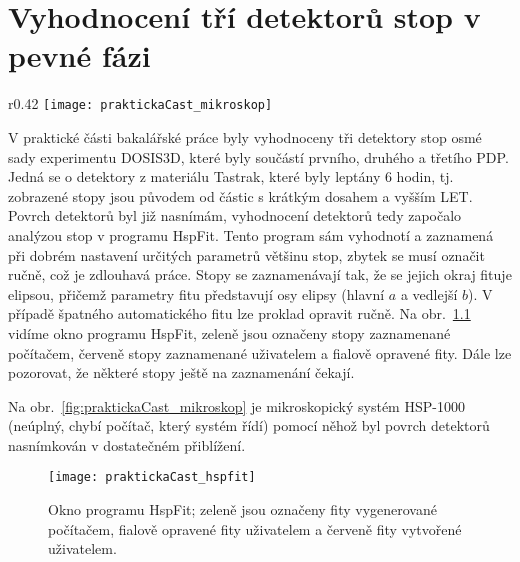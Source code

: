 \chapter{Vyhodnocení tří detektorů stop v pevné fázi}
\begin{wrapfigure}{r}{0.42\textwidth}
  \centering
  \texttt{[image: praktickaCast\_mikroskop]}
  \caption{Vysoko rychlostní optický mikroskop HSP-1000. \cite{dosis_HSP1000}}
  \label{fig:praktickaCast_mikroskop}
  \vspace{-10pt}
\end{wrapfigure}
V praktické části bakalářské práce byly vyhodnoceny tři detektory stop osmé sady experimentu DOSIS3D, které byly součástí prvního, druhého a třetího PDP. Jedná se o detektory z materiálu Tastrak, které byly leptány 6 hodin, tj. zobrazené stopy jsou původem od částic s krátkým dosahem a vyšším LET. Povrch detektorů byl již nasnímám, vyhodnocení detektorů tedy započalo analýzou stop v programu HspFit. Tento program sám vyhodnotí a zaznamená při dobrém nastavení určitých parametrů většinu stop, zbytek se musí označit ručně, což je zdlouhavá práce. Stopy se zaznamenávají tak, že se jejich okraj fituje elipsou, přičemž parametry fitu představují osy elipsy (hlavní $a$ a vedlejší $b$). V případě špatného automatického fitu lze proklad opravit ručně. Na obr.~\ref{fig:praktickaCast_hspfit} vidíme okno programu HspFit, zeleně jsou označeny stopy zaznamenané počítačem, červeně stopy zaznamenané uživatelem a fialově opravené fity. Dále lze
pozorovat, že některé stopy ještě na zaznamenání čekají. 

Na obr.~\ref{fig:praktickaCast_mikroskop} je mikroskopický systém HSP-1000 (neúplný, chybí počítač, který systém řídí) pomocí něhož byl povrch detektorů nasnímkován v dostatečném přiblížení.
\begin{figure}[ht]
  \centering
  \texttt{[image: praktickaCast\_hspfit]}
  \caption{Okno programu HspFit; zeleně jsou označeny fity vygenerované počítačem, fialově opravené fity uživatelem a červeně fity vytvořené uživatelem. \cite{dosis_HSP1000}}
  \label{fig:praktickaCast_hspfit}
\end{figure}

